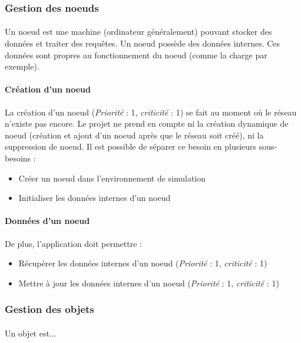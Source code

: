\documentclass[12pt]{article}
\newcommand{\besoin}[2] {
  (\textit{Priorité} : #1, \textit{criticité} : #2)
}
\begin{document}
\subsubsection{Gestion des noeuds}

\paragraph{} Un noeud est une machine (ordinateur généralement) pouvant stocker des données et traiter des requêtes. Un noeud possède des données internes. Ces données sont propres au fonctionnement du noeud (comme la charge par exemple).

\paragraph{Création d'un noeud} La création d'un noeud \besoin{1}{1} se fait au moment où le réseau n'existe pas encore. 
Le projet ne prend en compte ni la création dynamique de noeud (création et ajout d'un noeud après que le réseau soit créé), ni la suppression de noeud. 
Il est possible de séparer ce besoin en plusieurs sous-besoins :
 \begin{itemize}
 	\item Créer un noeud dans l'environnement de simulation
 	\item Initialiser les données internes d'un noeud \vspace{0.2cm}
 \end{itemize}
 
\paragraph{Données d'un noeud} De plus, l'application doit permettre :
\begin{itemize}
 \item Récupérer les données internes d'un noeud \besoin{1}{1}
 \item Mettre à jour les données internes d'un noeud \besoin{1}{1}
\end{itemize}

\subsubsection{Gestion des objets}

\paragraph{} Un objet est...
\end{document}
